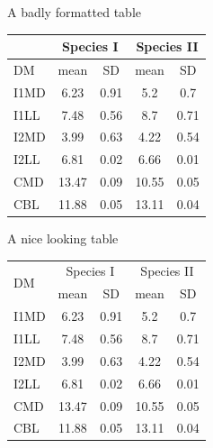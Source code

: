\documentclass[10pt,times]{beamer}
\begin{document}
\begin{frame}[fragile]{A badly formatted table}
\begin{exampletwouptinyfifty}
\begin{tabular}{|l|c|c|c|c|}
\hline 
& \multicolumn{2}{c}{Species I} &
	 \multicolumn{2}{c|}{Species II} \\ 
\hline
DM  & mean & SD  & mean & SD  \\ 
\hline 
\hline
I1MD & 6.23 & 0.91 & 5.2  & 0.7  \\
\hline 
I1LL & 7.48 & 0.56 & 8.7  & 0.71 \\
\hline 
I2MD & 3.99 & 0.63 & 4.22 & 0.54 \\
\hline 
I2LL & 6.81 & 0.02 & 6.66 & 0.01 \\
\hline 
CMD & 13.47 & 0.09 & 10.55 & 0.05 \\
\hline 
CBL & 11.88 & 0.05 & 13.11 & 0.04\\ 
\hline 
\end{tabular}
\end{exampletwouptinyfifty}
\end{frame}

\begin{frame}[fragile]{A nice looking table}
\begin{exampletwouptinyfifty}
\begin{tabular}{l c c c c}
\hline 
\multirow{2}{*}{DM}
 & \multicolumn{2}{c}{Species I}
 & \multicolumn{2}{c}{Species II} \\ 
\cline{2-5}
  & mean & SD  & mean & SD  \\ 
\hline
I1MD & 6.23 & 0.91 & 5.2  & 0.7  \\

I1LL & 7.48 & 0.56 & 8.7  & 0.71 \\

I2MD & 3.99 & 0.63 & 4.22 & 0.54 \\

I2LL & 6.81 & 0.02 & 6.66 & 0.01 \\

CMD & 13.47 & 0.09 & 10.55 & 0.05 \\

CBL & 11.88 & 0.05 & 13.11 & 0.04\\ 
\hline 
\end{tabular}
\end{exampletwouptinyfifty}
\end{frame}
\end{document}
